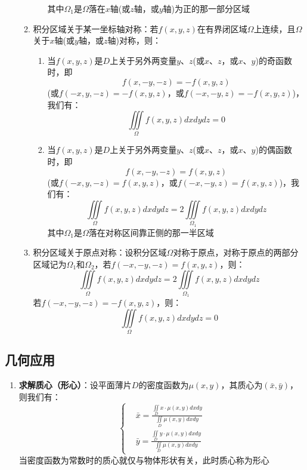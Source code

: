 \documentclass[12pt,a4paper,UTF8]{book}
\begin{document}
\begin{enumerate}
\begin{enumerate}
\begin{enumerate}
其中$\Omega_1$是$\Omega$落在$x$轴(或$z$轴，或$y$轴)为正的那一部分区域
\end{enumerate}
\item 积分区域关于某一坐标轴对称：若$f\left(x,y,z\right)$在有界闭区域$\Omega$上连续，且$\Omega$关于$x$轴(或$y$轴，或$z$轴)对称，则：
\begin{enumerate}
\item 当$f\left(x,y,z\right)$是$D$上关于另外两变量$y$、$z$(或$x$、$z$，或$x$、$y$)的奇函数时，即
\[f\left(x,-y,-z\right)=-f\left(x,y,z\right)\]
(或$f\left(-x,y,-z\right)=-f\left(x,y,z\right)$，或$f\left(-x,-y,z\right)=-f\left(x,y,z\right)$)，我们有：
\[\iiint\limits_{\Omega}f\left(x,y,z\right)dxdydz=0\]
\item 当$f\left(x,y,z\right)$是$D$上关于另外两变量$y$、$z$(或$x$、$z$，或$x$、$y$)的偶函数时，即
\[f\left(x,-y,-z\right)=f\left(x,y,z\right)\]
(或$f\left(-x,y,-z\right)=f\left(x,y,z\right)$，或$f\left(-x,-y,z\right)=f\left(x,y,z\right)$)，我们有：
\[\iiint\limits_{\Omega}f\left(x,y,z\right)dxdydz=2\iiint\limits_{\Omega_1}f\left(x,y,z\right)dxdydz\]
其中$\Omega_1$是$\Omega$落在对称区间靠正侧的那一半区域
\end{enumerate}
\item 积分区域关于原点对称：设积分区域$\Omega$对称于原点，对称于原点的两部分区域记为$\Omega_1$和$\Omega_2$，若$f\left(-x,-y,-z\right)=f\left(x,y,z\right)$，则：
\[\iiint\limits_{\Omega}f\left(x,y,z\right)dxdydz=2\iiint\limits_{\Omega_1}f\left(x,y,z\right)dxdydz\]
若$f\left(-x,-y,-z\right)=-f\left(x,y,z\right)$，则：
\[\iiint\limits_{\Omega}f\left(x,y,z\right)dxdydz=0\]
\end{enumerate}
\end{enumerate}

\subsection{几何应用}
\begin{enumerate}
\item \textbf{求解质心（形心）}：设平面薄片$D$的密度函数为$\mu\left(x,y\right)$，其质心为$\left(\bar{x},\bar{y}\right)$，则我们有：
\[\left\{\begin{aligned}
&\bar{x}=\frac{\iint\limits_{D}x\cdot\mu\left(x,y\right)dxdy}{\iint\limits_{D}\mu\left(x,y\right)dxdy}\\
&\bar{y}=\frac{\iint\limits_{D}y\cdot\mu\left(x,y\right)dxdy}{\iint\limits_{D}\mu\left(x,y\right)dxdy}
\end{aligned}\right.\]
当密度函数为常数时的质心就仅与物体形状有关，此时质心称为形心
\end{enumerate}
\end{document}
